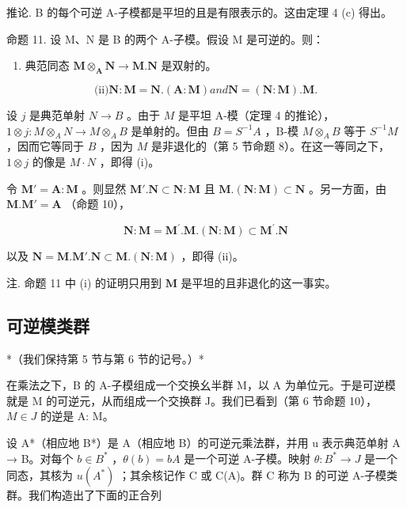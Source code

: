 推论. B 的每个可逆 A-子模都是平坦的且是有限表示的。这由定理 4 (c) 得出。

命题 11. 设 M、N 是 B 的两个 A-子模。假设 M 是可逆的。则：

\begin{enumerate}
\def\labelenumi{(\roman{enumi})}
\tightlist
\item
  典范同态 \(\mathbf{M} \otimes_{\mathbf{A}} \mathbf{N} \to \mathbf{M}. \mathbf{N}\) 是双射的。
\end{enumerate}

\[
\text {(ii)} \mathbf {N}: \mathbf {M} = \mathbf {N}. (\mathbf {A}: \mathbf {M}) a n d \mathbf {N} = (\mathbf {N}: \mathbf {M}). \mathbf {M}.
\]

设 \(j\) 是典范单射 \(N \to B\) 。由于 \(M\) 是平坦 A-模（定理 4 的推论），\(1 \otimes j \colon M \otimes_{A} N \to M \otimes_{A} B\) 是单射的。但由 \(B = S^{-1}A\) ，B-模 \(M \otimes_{A} B\) 等于 \(S^{-1}M\) ，因而它等同于 \(B\) ，因为 \(M\) 是非退化的（第 5 节命题 8）。在这一等同之下，\(1 \otimes j\) 的像是 \(M \cdot N\) ，即得 (i)。

令 \(\mathbf{M}' = \mathbf{A} : \mathbf{M}\) 。则显然 \(\mathbf{M}' . \mathbf{N} \subset \mathbf{N} : \mathbf{M}\) 且 \(\mathbf{M} . (\mathbf{N} : \mathbf{M}) \subset \mathbf{N}\) 。另一方面，由 \(\mathbf{M} . \mathbf{M}' = \mathbf{A}\) （命题 10），

\[
\mathbf {N}: \mathbf {M} = \mathbf {M} ^ {\prime}. \mathbf {M}. (\mathbf {N}: \mathbf {M}) \subset \mathbf {M} ^ {\prime}. \mathbf {N}
\]

以及 \(\mathbf{N} = \mathbf{M}.\mathbf{M}'.\mathbf{N}\subset \mathbf{M}.(\mathbf{N}:\mathbf{M})\) ，即得 (ii)。

注. 命题 11 中 (i) 的证明只用到 \(\mathbf{M}\) 是平坦的且非退化的这一事实。

\subsection{可逆模类群}

*（我们保持第 5 节与第 6 节的记号。）*

在乘法之下，B 的 A-子模组成一个交换幺半群 M，以 A 为单位元。于是可逆模就是 M 的可逆元，从而组成一个交换群 J。我们已看到（第 6 节命题 10），\(M \in J\) 的逆是 A: M。

设 A*（相应地 B*）是 A（相应地 B）的可逆元乘法群，并用 u 表示典范单射 A → B。对每个 \(b \in B^{*}\) ，\(\theta(b) = bA\) 是一个可逆 A-子模。映射 \(\theta: B^{*} \to J\) 是一个同态，其核为 \(u(A^{*})\) ；其余核记作 C 或 C(A)。群 C 称为 B 的可逆 A-子模类群。我们构造出了下面的正合列


